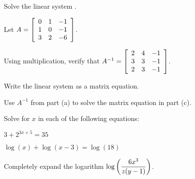 \documentclass[12pt,legalpaper]{exam}
\begin{document}
\addpoints

\noindent
\begin{center}
\gradetable[v][pages]  %
\end{center}


\newpage %

%
%
%

\begin{questions}
\question[4] Solve the linear system .
\newpage

\question[3] Let $A = \MATRIX{rrr}{0 & 1 & -1\\1 & 0 & -1\\3 & 2 & -6}$.
\begin{compactenum}[(a)]
\item Using multiplication, verify that $A^{-1} = \MATRIX{rrr}{2 & 4 & -1\\3 & 3 & -1\\2 & 3 & -1}$.
\vspace{8cm}

\item Write the linear system
 as a matrix equation.
\vspace{6cm}

\item Use $A^{-1}$ from part (a) to solve the matrix equation in part (c).
\end{compactenum}
\newpage

\question[2] Solve for $x$ in each of the following equations:
\begin{compactenum}[(a)]
\item $3 + 2^{3x + 5} = 35$
\vspace{8cm}

\item $\log(x) + \log(x - 3) = \log(18)$
\vspace{8cm}
\end{compactenum}

\question[2] Completely expand the logarithm $\ds{\log\left(\frac{6x^3}{z(y - 1)}\right)}$.
\newpage


\end{questions}
\end{document}
